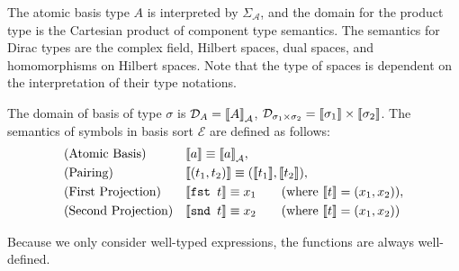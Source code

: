 The atomic basis type $A$ is interpreted by $\Sigma_\mathcal{A}$, and the domain for the product type is the Cartesian product of component type semantics. The semantics for Dirac types are the complex field, Hilbert spaces, dual spaces, and homomorphisms on Hilbert spaces. Note that the type of spaces is dependent on the interpretation of their type notations.

\begin{definition}
  The domain of basis of type $\sigma$ is $\mathcal{D}_A = {\llbracket A \rrbracket}_\mathcal{A}$, $\mathcal{D}_{\sigma_1 \times \sigma_2} = {\llbracket \sigma_1 \rrbracket} \times {\llbracket \sigma_2 \rrbracket}$.
  The semantics of symbols in basis sort $\mathcal{E}$ are defined as follows:
  \begin{align*}
    & \text{(Atomic Basis)} && {\llbracket a \rrbracket} \equiv {\llbracket a \rrbracket}_\mathcal{A}, \\
    & \text{(Pairing)} &&
    {\llbracket (t_1, t_2) \rrbracket} \equiv ({\llbracket t_1 \rrbracket}, {\llbracket t_2 \rrbracket}), \\
    & \text{(First Projection)} &&
    {\llbracket \texttt{fst } t \rrbracket} \equiv x_1 \qquad (\text{where } {\llbracket t \rrbracket} = (x_1, x_2)), \\
    & \text{(Second Projection)} &&
    {\llbracket \texttt{snd } t \rrbracket} \equiv x_2 \qquad (\text{where } {\llbracket t \rrbracket} = (x_1, x_2))
  \end{align*}
\end{definition}

Because we only consider well-typed expressions, the functions are always well-defined.




